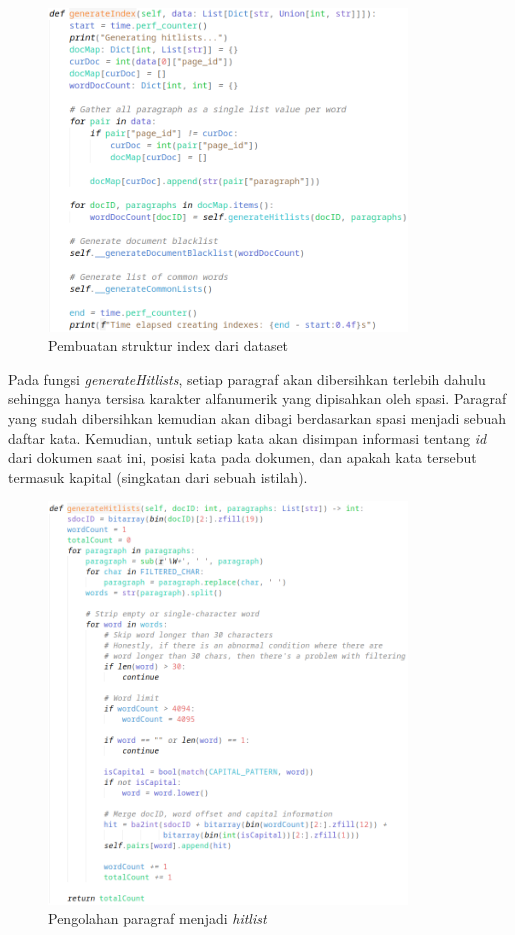 \begin{figure}[H]
  \centering{}
	\includegraphics[width=0.85\textwidth]{gambar/implementasi_generateindex}
  \caption{Pembuatan struktur index dari dataset}
\end{figure}

Pada fungsi \textit{generateHitlists}, setiap paragraf akan dibersihkan terlebih 
dahulu sehingga hanya tersisa karakter alfanumerik yang dipisahkan oleh spasi.
Paragraf yang sudah dibersihkan kemudian akan dibagi berdasarkan spasi menjadi 
sebuah daftar kata. Kemudian, untuk setiap kata akan disimpan informasi tentang 
\textit{id} dari dokumen saat ini, posisi kata pada dokumen, dan apakah kata 
tersebut termasuk kapital (singkatan dari sebuah istilah).

\begin{figure}[H]
  \centering{}
	\includegraphics[width=0.85\textwidth]{gambar/implementasi_generatehitlists}
  \caption{Pengolahan paragraf menjadi \textit{hitlist}}
\end{figure}

